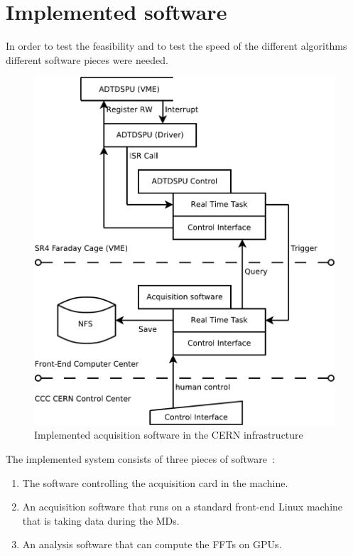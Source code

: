\glsresetall
\chapter{Implemented software}

In order to test the feasibility and to test the speed of the different algorithms different software pieces were needed.

\begin{figure}[H]
\caption{Implemented acquisition software in the CERN infrastructure}
\centering
\includegraphics[scale=0.4]{ImplementedSoftFesa.pdf}
\end{figure}

The implemented system consists of three pieces of software~:
\begin{enumerate}
\item The software controlling the acquisition card in the machine.
\item An acquisition software that runs on a standard front-end Linux machine that is taking data during the \glspl{MD}.
\item An analysis software that can compute the \glspl{FFT} on \glspl{GPU}.
\end{enumerate}

